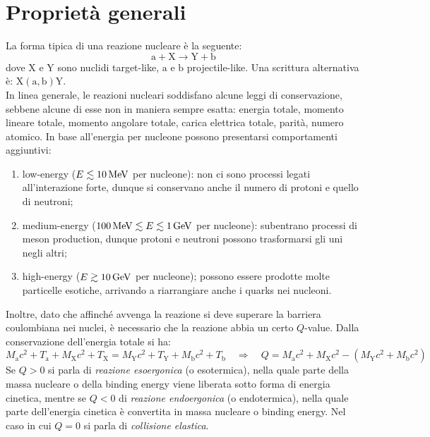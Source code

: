
\section{Proprietà generali}

La forma tipica di una reazione nucleare è la seguente:
\begin{equation*}
	\mathrm{a} + \mathrm{X} \rightarrow \mathrm{Y} + \mathrm{b}
\end{equation*}
dove $ \mathrm{X} $ e $ \mathrm{Y} $ sono nuclidi target-like, $ \mathrm{a} $ e $ \mathrm{b} $ projectile-like. Una scrittura alternativa è: $ \mathrm{X} \left( \mathrm{a},\mathrm{b} \right) \mathrm{Y} $.\\
In linea generale, le reazioni nucleari soddisfano alcune leggi di conservazione, sebbene alcune di esse non in maniera sempre esatta: energia totale, momento lineare totale, momento angolare totale, carica elettrica totale, parità, numero atomico. In base all'energia per nucleone possono presentarsi comportamenti aggiuntivi:
\begin{enumerate}
	\item low-energy ($ E \lesssim 10\,\mathrm{MeV} $ per nucleone): non ci sono processi legati all'interazione forte, dunque si conservano anche il numero di protoni e quello di neutroni;
	\item medium-energy ($ 100\,\mathrm{MeV} \lesssim E \lesssim 1\,\mathrm{GeV} $ per nucleone): subentrano processi di meson production, dunque protoni e neutroni possono trasformarsi gli uni negli altri;
	\item high-energy ($ E \gtrsim 10\,\mathrm{GeV} $ per nucleone); possono essere prodotte molte particelle esotiche, arrivando a riarrangiare anche i quarks nei nucleoni.
\end{enumerate}
Inoltre, dato che affinché avvenga la reazione si deve superare la barriera coulombiana nei nuclei, è necessario che la reazione abbia un certo $ Q $-value. Dalla conservazione dell'energia totale si ha:
\begin{equation*}
	M_{\mathrm{a}} c^2 + T_{\mathrm{a}} + M_{\mathrm{X}} c^2 + T_{\mathrm{X}} = M_{\mathrm{Y}} c^2 + T_{\mathrm{Y}} + M_{\mathrm{b}} c^2 + T_{\mathrm{b}}
	\quad \Rightarrow \quad
	Q = M_{\mathrm{a}} c^2 + M_{\mathrm{X}} c^2 - \left( M_{\mathrm{Y}} c^2 + M_{\mathrm{b}} c^2 \right)
\end{equation*}
Se $ Q > 0 $ si parla di \textit{reazione esoergonica} (o esotermica), nella quale parte della massa nucleare o della binding energy viene liberata sotto forma di energia cinetica, mentre se $ Q < 0 $ di \textit{reazione endoergonica} (o endotermica), nella quale parte dell'energia cinetica è convertita in massa nucleare o binding energy. Nel caso in cui $ Q = 0 $ si parla di \textit{collisione elastica}.\\
